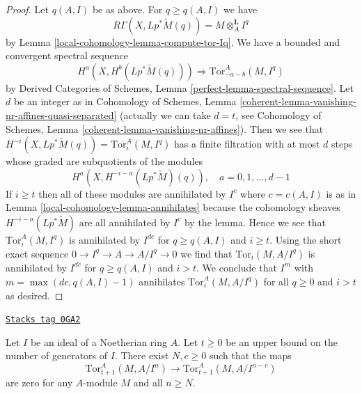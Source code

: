 \begin{proof}
Let $q(A, I)$ be as above. For $q \geq q(A, I)$ we have
$$
R\Gamma(X, Lp^*\widetilde{M}(q)) = M \otimes_A^\mathbf{L} I^q
$$
by Lemma \ref{local-cohomology-lemma-compute-tor-Iq}.
We have a bounded and convergent spectral sequence
$$
H^a(X, H^b(Lp^*\widetilde{M}(q))) \Rightarrow
\text{Tor}_{-a - b}^A(M, I^q)
$$
by Derived Categories of Schemes, Lemma \ref{perfect-lemma-spectral-sequence}.
Let $d$ be an integer as in Cohomology of Schemes, Lemma
\ref{coherent-lemma-vanishing-nr-affines-quasi-separated}
(actually we can take $d = t$, see
Cohomology of Schemes, Lemma \ref{coherent-lemma-vanishing-nr-affines}).
Then we see that $H^{-i}(X, Lp^*\widetilde{M}(q)) = \text{Tor}_i^A(M, I^q)$
has a finite filtration with at most $d$ steps whose graded are
subquotients of the modules
$$
H^a(X, H^{- i - a}(Lp^*\widetilde{M})(q)),\quad
a = 0, 1, \ldots, d - 1
$$
If $i \geq t$ then all of these modules are annihilated
by $I^c$ where $c = c(A, I)$ is as in Lemma \ref{local-cohomology-lemma-annihilates}
because the cohomology sheaves $H^{- i - a}(Lp^*\widetilde{M})$
are all annihilated by $I^c$ by the lemma. Hence we see that
$\text{Tor}_i^A(M, I^q)$ is annihilated by $I^{dc}$ for
$q \geq q(A, I)$ and $i \geq t$. Using the short exact sequence
$0 \to I^q \to A \to A/I^q \to 0$ we find that
$\text{Tor}_i(M, A/I^q)$ is annihilated by $I^{dc}$ for $q \geq q(A, I)$
and $i > t$. We conclude that $I^m$ with $m = \max(dc, q(A, I) - 1)$
annihilates $\text{Tor}_i^A(M, A/I^q)$ for all $q \geq 0$
and $i > t$ as desired.
\end{proof}

\begin{lemma}
\label{local-cohomology-lemma-tor-maps-vanish}
\href{https://stacks.math.columbia.edu/tag/0GA2}{\texttt{Stacks tag 0GA2}}

Let $I$ be an ideal of a Noetherian ring $A$. Let $t \geq 0$
be an upper bound on the number of generators of $I$.
There exist $N, c \geq 0$ such that the maps
$$
\text{Tor}_{t + 1}^A(M, A/I^n) \to \text{Tor}_{t + 1}^A(M, A/I^{n - c})
$$
are zero for any $A$-module $M$ and all $n \geq N$.
\end{lemma}

